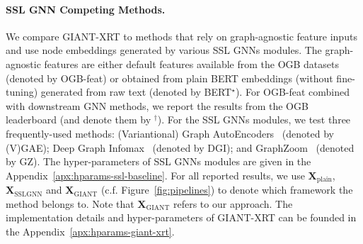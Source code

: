 \documentclass{article} %
\begin{document}
\paragraph{SSL GNN Competing Methods.}
We compare GIANT-XRT to methods that rely on graph-agnostic feature inputs and use node embeddings generated by various SSL GNNs modules. The graph-agnostic features are either default features available from the OGB datasets (denoted by OGB-feat) or obtained from plain BERT embeddings (without fine-tuning) generated from raw text (denoted by BERT$^\star$). For OGB-feat combined with downstream GNN methods, we report the results from the OGB leaderboard (and denote them by $^\dagger$).
For the SSL GNNs modules, we test three frequently-used methods:
(Variantional) Graph AutoEncoders~\citep{kipf2016variational} (denoted by (V)GAE); Deep Graph Infomax~\citep{velickovic2019deep} (denoted by DGI); and GraphZoom~\citep{deng2020graphzoom} (denoted by GZ).
The hyper-parameters of SSL GNNs modules are given in the Appendix~\ref{apx:hparams-ssl-baseline}.
For all reported results, we use $\mathbf{X}_{\text{plain}}$, $\mathbf{X}_{\text{SSLGNN}}$ and $\mathbf{X}_{\text{GIANT}}$ (c.f. Figure~\ref{fig:pipelines}) to denote which framework the method belongs to. Note that $\mathbf{X}_{\text{GIANT}}$ refers to our approach. The implementation details and hyper-parameters of GIANT-XRT can be founded in the Appendix~\ref{apx:hparams-giant-xrt}.
\end{document}
